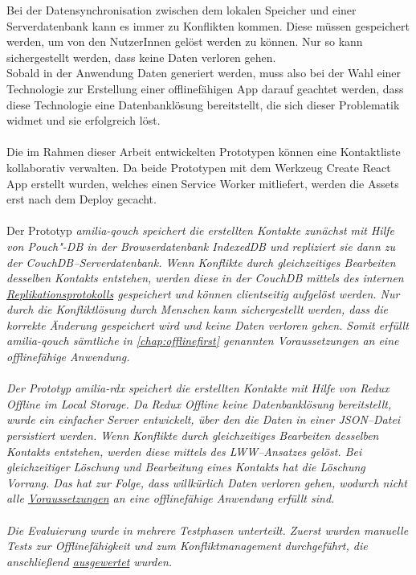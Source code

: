 Bei der Datensynchronisation zwischen dem lokalen Speicher und einer Serverdatenbank kann es immer zu Konflikten kommen.
Diese müssen gespeichert werden, um von den NutzerInnen gelöst werden zu können. Nur so kann sichergestellt werden, dass keine Daten verloren gehen.\\
Sobald in der Anwendung Daten generiert werden, muss also bei der Wahl einer Technologie zur Erstellung einer offlinefähigen \gls{App} darauf geachtet werden, dass diese Technologie eine Datenbanklösung bereitstellt, die sich dieser Problematik widmet und sie erfolgreich löst.\\\\
%
%
%
Die im Rahmen dieser Arbeit entwickelten Prototypen können eine Kontaktliste kollaborativ verwalten.
Da beide Prototypen mit dem Werkzeug Create React App erstellt wurden, welches einen Service Worker mitliefert, werden die \gls{Assets} erst nach dem Deploy gecacht.\\\\
Der Prototyp \it{amilia-qouch} speichert die erstellten Kontakte zunächst mit Hilfe von Pouch"-DB in der Browserdatenbank IndexedDB und repliziert sie dann zu der CouchDB--Serverdatenbank.
Wenn Konflikte durch gleichzeitiges Bearbeiten desselben Kontakts entstehen, werden diese in der CouchDB mittels des internen \hyperref[chap:replication]{Replikationsprotokolls} gespeichert und können clientseitig aufgelöst werden.
Nur durch die Konfliktlösung durch Menschen kann sichergestellt werden, dass die korrekte Änderung gespeichert wird und keine Daten verloren gehen.
Somit erfüllt \it{amilia-qouch} sämtliche in \autoref{chap:offlinefirst} genannten Voraussetzungen an eine offlinefähige Anwendung.\\\\
%
Der Prototyp \it{amilia-rdx} speichert die erstellten Kontakte mit Hilfe von Redux Offline im Local Storage.
Da Redux Offline keine Datenbanklösung bereitstellt, wurde ein einfacher Server entwickelt, über den die Daten in einer \gls{JSON}--Datei persistiert werden.
Wenn Konflikte durch gleichzeitiges Bearbeiten desselben Kontakts entstehen, werden diese mittels des \gls{LWW}--Ansatzes gelöst.
Bei gleichzeitiger Löschung und Bearbeitung eines Kontakts hat die Löschung Vorrang.
Das hat zur Folge, dass willkürlich Daten verloren gehen, wodurch nicht alle \hyperref[chap:offlinefirst]{Voraussetzungen} an eine offlinefähige Anwendung erfüllt sind.\\\\
%
%
Die Evaluierung wurde in mehrere Testphasen unterteilt. Zuerst wurden manuelle Tests zur Offlinefähigkeit und zum Konfliktmanagement durchgeführt, die anschließend \hyperref[chap:testauswertung]{ausgewertet} wurden.
